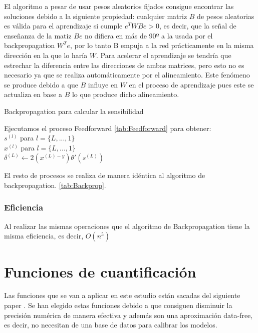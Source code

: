 El algoritmo a pesar de usar pesos aleatorios fijados consigue encontrar las soluciones debido a la siguiente propiedad: cualquier matriz $B$ de pesos aleatorias es válida para el aprendizaje si cumple $e^{T}WBe>0$, es decir, que la señal de enseñanza de la matiz $Be$ no difiera en más de 90º a la usada por el backpropagation $W^{T}e$, por lo tanto B empuja a la red prácticamente en la misma dirección en la que lo haría $W$. Para acelerar el aprendizaje se tendría que estrechar la diferencia entre las direcciones de ambas matrices, pero esto no es necesario ya que se realiza automáticamente por el alineamiento. Este fenómeno se produce debido a que $B$ influye en $W$ en el proceso de aprendizaje pues este se actualiza en base a $B$ lo que produce dicho alineamiento.

\begin{algorithm}[H]
   \caption{Backpropagation para calcular la sensibilidad}
   Ejecutamos el proceso Feedforward \ref{tab:Feedforward} para obtener:\\
   $s^{(l)}$ para $l = \{L,...,1\}$ \\
   $x^{(l)}$ para $l = \{L,...,1\}$ \\  
   $\delta^{(L)} \gets 2(x^{(L)-y})\theta'(s^{(L)})$ \\
   
\end{algorithm}

El resto de procesos se realiza de manera idéntica al algoritmo de backpropagation. \ref{tab:Backprop}.

\subsubsection{Eficiencia}

Al realizar las mismas operaciones que el algoritmo de Backpropagation tiene la misma eficiencia, es decir, $O(n^{5})$

\section{Funciones de cuantificación}
Las funciones que se van a aplicar en este estudio están sacadas del siguiente paper \cite{nayak2019bit}. Se han elegido estas funciones debido a que consiguen disminuir la precisión numérica de manera efectiva y además son una aproximación data-free, es decir, no necesitan de una base de datos para calibrar los modelos.

